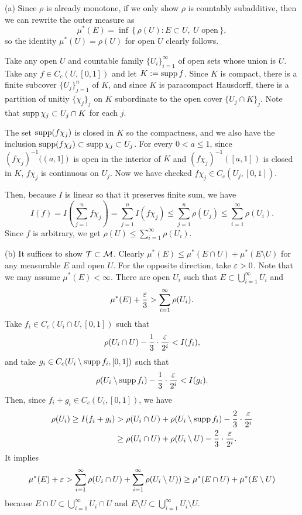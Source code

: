\documentclass{../../large}
\begin{document}
\begin{pf}
(a)
Since $\rho$ is already monotone, if we only show $\rho$ is countably subadditive, then we can rewrite the outer measure as
\[\mu^*(E)=\inf\,\{\,\rho(U):E\subset U,\ U\text{ open}\,\},\]
so the identity $\mu^*(U)=\rho(U)$ for open $U$ clearly follows.

Take any open $U$ and countable family $\{U_i\}_{i=1}^\infty$ of open sets whose union is $U$.
Take any $f\in C_c(U,[0,1])$ and let $K:=\operatorname{supp} f$.
Since $K$ is compact, there is a finite subcover $\{U_j\}_{j=1}^n$ of $K$, and since $K$ is paracompact Hausdorff, there is a partition of unitiy $\{\chi_j\}_j$ on $K$ subordinate to the open cover $\{U_j\cap K\}_j$.
Note that $\operatorname{supp}\chi_j\subset U_j\cap K$ for each $j$.

The set $\operatorname{supp}(f\chi_j)$ is closed in $K$ so the compactness, and we also have the inclusion $\operatorname{supp}(f\chi_j)\subset\operatorname{supp}\chi_j\subset U_j$.
For every $0<a\le 1$, since $(f\chi_j)^{-1}((a,1])$ is open in the interior of $K$ and $(f\chi_j)^{-1}([a,1])$ is closed in $K$, $f\chi_j$ is continuous on $U_j$.
Now we have checked $f\chi_j\in C_c(U_j,[0,1])$.

Then, because $I$ is linear so that it preserves finite sum, we have
\[I(f)=I\left(\sum_{j=1}^n f\chi_j\right)=\sum_{j=1}^n I(f\chi_j)\le\sum_{j=1}^n\rho(U_j)\le\sum_{i=1}^\infty\rho(U_i).\]
Since $f$ is arbitrary, we get $\rho(U)\le\sum_{i=1}^\infty\rho(U_i)$.

(b)
It suffices to show $\mathcal{T}\subset\mathcal{M}$.
Clearly $\mu^*(E)\le\mu^*(E\cap U)+\mu^*(E\setminus U)$ for any measurable $E$ and open $U$.
For the opposite direction, take $\varepsilon>0$.
Note that we may assume $\mu^*(E)<\infty$.
There are open $U_i$ such that $E\subset\bigcup_{i=1}^\infty U_i$ and
\[\mu^*(E)+\frac{\varepsilon}3>\sum_{i=1}^\infty\rho(U_i).\]
Take $f_i\in C_c(U_i\cap U,[0,1])$ such that
\[\rho(U_i\cap U)-\frac13\cdot\frac{\varepsilon}{2^i}<I(f_i),\]
and take $g_i\in C_c(U_i\setminus\operatorname{supp} f_i,[0,1])$ such that
\[\rho(U_i\setminus\operatorname{supp} f_i)-\frac13\cdot\frac{\varepsilon}{2^i}<I(g_i).\]
Then, since $f_i+g_i\in C_c(U_i,[0,1])$, we have
\begin{align*}
\rho(U_i)\ge I(f_i+g_i)
&>\rho(U_i\cap U)+\rho(U_i\setminus\operatorname{supp} f_i)-\frac23\cdot\frac{\varepsilon}{2^i}\\
&\ge\rho(U_i\cap U)+\rho(U_i\setminus U)-\frac23\cdot\frac{\varepsilon}{2^i}.
\end{align*}
It implies
\[\mu^*(E)+\varepsilon>\sum_{i=1}^\infty\rho(U_i\cap U)+\sum_{i=1}^\infty\rho(U_i\setminus U))\ge\mu^*(E\cap U)+\mu^*(E\setminus U)\]
because $E\cap U\subset\bigcup_{i=1}^\infty U_i\cap U$ and $E\setminus U\subset\bigcup_{i=1}^\infty U_i\setminus U$.



\end{pf}
\end{document}
